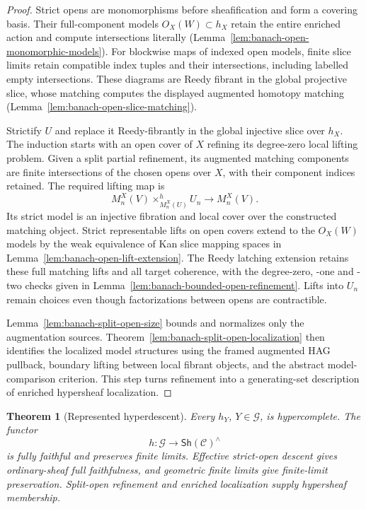 \documentclass[12pt]{amsart}
\newtheorem{thm}{Theorem}[section]
\theoremstyle{definition}
\theoremstyle{remark}
\numberwithin{equation}{section}
\newcommand{\Sh}{\mathsf{Sh}}
\begin{document}
\begin{proof}
Strict opens are monomorphisms before sheafification
and form a covering basis. Their full-component
models $O_X(W)\subset h_X$ retain the entire enriched
action and compute intersections literally
(Lemma~\ref{lem:banach-open-monomorphic-models}).
For blockwise maps of indexed open models, finite
slice limits retain compatible index tuples and
their intersections, including labelled empty
intersections. These diagrams are Reedy fibrant
in the global projective slice, whose matching
computes the displayed augmented homotopy matching
(Lemma~\ref{lem:banach-open-slice-matching}).

Strictify $U$ and replace it Reedy-fibrantly in
the global injective slice over $h_X$. The
induction starts with an open cover of $X$
refining its degree-zero local lifting problem.
Given a split partial refinement, its
augmented matching components are finite intersections
of the chosen opens over $X$, with their component
indices retained. The required lifting map is
\begin{equation}
\label{eq:banach-relative-matching}
 M_n^X(V)\times^h_{M_n^X(U)}U_n
 \longrightarrow M_n^X(V).
\end{equation}
Its strict model is an injective fibration and
local cover over the constructed matching object.
Strict representable lifts on open covers extend
to the $O_X(W)$ models by the weak equivalence of
Kan slice mapping spaces in
Lemma~\ref{lem:banach-open-lift-extension}.
The Reedy latching extension retains these full
matching lifts and all target coherence, with the
degree-zero, -one and -two checks given in
Lemma~\ref{lem:banach-bounded-open-refinement}.
Lifts into $U_n$ remain choices even though
factorizations between opens are contractible.

Lemma~\ref{lem:banach-split-open-size} bounds and
normalizes only the augmentation sources.
Theorem~\ref{lem:banach-split-open-localization}
then identifies the localized model structures using
the framed augmented HAG pullback,
boundary lifting between local fibrant objects,
and the abstract model-comparison criterion. This
step turns refinement into a generating-set description
of enriched hypersheaf localization.
\end{proof}

\begin{thm}[Represented hyperdescent]
Every $h_Y$, $Y\in\mathcal G$, is hypercomplete.
\label{thm:banach-representability}
The functor
\[
 h:\mathcal G\longrightarrow\Sh(\mathcal C)^\wedge
\]
is fully faithful and preserves finite limits.
Effective strict-open descent gives ordinary-sheaf
full faithfulness, and geometric finite limits give
finite-limit preservation. Split-open refinement and
enriched localization supply hypersheaf membership.
\end{thm}
\end{document}
